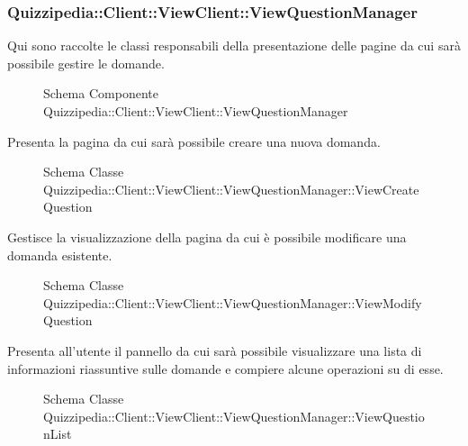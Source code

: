 \subsubsection{Quizzipedia::Client::ViewClient::ViewQuestionManager}
Qui sono raccolte le classi responsabili della presentazione delle pagine da cui sarà possibile gestire le domande.
\begin{figure}[H]
\centering
\noindent{}
\caption{Schema Componente Quizzipedia::Client::ViewClient::ViewQuestionManager}
\end{figure}
Presenta la pagina da cui sarà possibile creare una nuova domanda.
\begin{figure}[H]
\centering
\noindent{}
\caption{Schema Classe Quizzipedia::Client::ViewClient::ViewQuestionManager::ViewCreateQuestion}
\end{figure}
Gestisce la visualizzazione della pagina da cui è possibile modificare una domanda esistente.
\begin{figure}[H]
\centering
\noindent{}
\caption{Schema Classe Quizzipedia::Client::ViewClient::ViewQuestionManager::ViewModifyQuestion}
\end{figure}
Presenta all'utente il pannello da cui sarà possibile visualizzare una lista di informazioni riassuntive sulle domande e compiere alcune operazioni su di esse.
\begin{figure}[H]
\centering
\noindent{}
\caption{Schema Classe Quizzipedia::Client::ViewClient::ViewQuestionManager::ViewQuestionList}
\end{figure}
